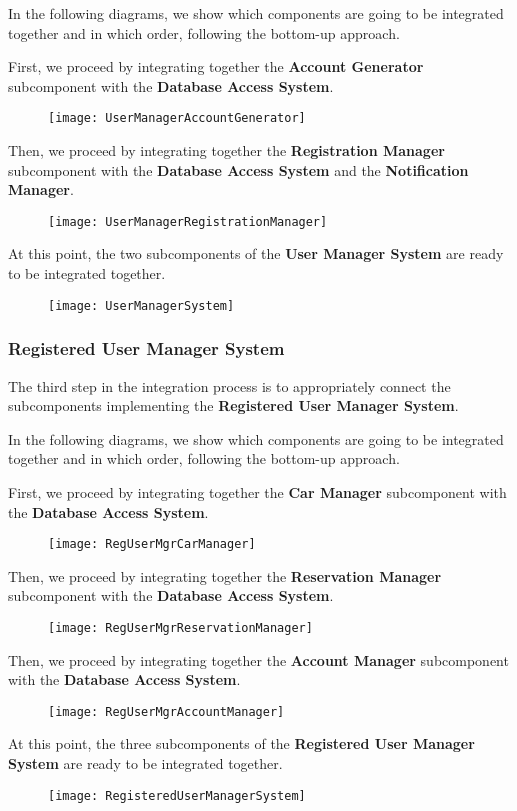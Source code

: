 In the following diagrams, we show which components are going to be integrated together and in which order, following the bottom-up approach.

First, we proceed by integrating together the \textbf{Account Generator} subcomponent with the \textbf{Database Access System}.
\begin{figure}[H]
	\centering
	\texttt{[image: UserManagerAccountGenerator]}
\end{figure}

Then, we proceed by integrating together the \textbf{Registration Manager} subcomponent with the \textbf{Database Access System} and the \textbf{Notification Manager}.
\begin{figure}[H]
	\centering
	\texttt{[image: UserManagerRegistrationManager]}
\end{figure}

At this point, the two subcomponents of the \textbf{User Manager System} are ready to be integrated together.
\begin{figure}[H]
	\centering
	\texttt{[image: UserManagerSystem]}
\end{figure}

\subsubsection*{Registered User Manager System}
The third step in the integration process is to appropriately connect the subcomponents implementing the \textbf{Registered User Manager System}.

In the following diagrams, we show which components are going to be integrated together and in which order, following the bottom-up approach.

First, we proceed by integrating together the \textbf{Car Manager} subcomponent with the \textbf{Database Access System}.
\begin{figure}[H]
	\centering
	\texttt{[image: RegUserMgrCarManager]}
\end{figure}

Then, we proceed by integrating together the \textbf{Reservation Manager} subcomponent with the \textbf{Database Access System}.
\begin{figure}[H]
	\centering
	\texttt{[image: RegUserMgrReservationManager]}
\end{figure}

Then, we proceed by integrating together the \textbf{Account Manager} subcomponent with the \textbf{Database Access System}.
\begin{figure}[H]
	\centering
	\texttt{[image: RegUserMgrAccountManager]}
\end{figure}
\newpage
At this point, the three subcomponents of the \textbf{Registered User Manager System} are ready to be integrated together.
\begin{figure}[H]
	\centering
	\texttt{[image: RegisteredUserManagerSystem]}
\end{figure}
\newpage
